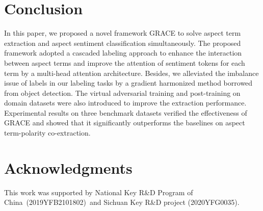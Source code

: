 \documentclass[11pt,a4paper]{article}
\begin{document}
\section{Conclusion}
\label{sec_conclusion}
In this paper, we proposed a novel framework GRACE to solve aspect term extraction and aspect sentiment classification simultaneously. The proposed framework adopted a cascaded labeling approach to enhance the interaction between aspect terms and improve the attention of sentiment tokens for each term by a multi-head attention architecture. Besides, we alleviated the imbalance issue of labels in our labeling tasks by a gradient harmonized method borrowed from object detection. The virtual adversarial training and post-training on domain datasets were also introduced to improve the extraction performance. Experimental results on three benchmark datasets verified the effectiveness of GRACE and showed that it significantly outperforms the baselines on aspect term-polarity co-extraction.

\section*{Acknowledgments}
This work was supported by National Key R\&D Program of China (2019YFB2101802) and Sichuan Key R\&D project (2020YFG0035).



\end{document}
